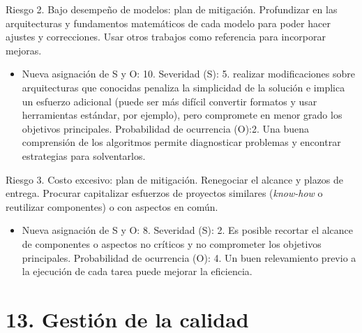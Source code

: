 \documentclass[11pt]{charter}
\begin{document}
Riesgo 2. Bajo desempeño de modelos: plan de mitigación. Profundizar en las arquitecturas y fundamentos matemáticos de cada modelo para poder hacer ajustes y correcciones. Usar otros trabajos como referencia para incorporar mejoras. 
\begin{itemize}
	\item Nueva asignación de S y O: 10.
	\subitem Severidad (S): 5. realizar modificaciones sobre arquitecturas que conocidas penaliza la simplicidad de la solución e implica un esfuerzo adicional (puede ser más difícil convertir formatos y usar herramientas estándar, por ejemplo), pero compromete en menor grado los objetivos principales.
	\subitem Probabilidad de ocurrencia (O):2. Una buena comprensión de los algoritmos permite diagnosticar problemas y encontrar estrategias para solventarlos.
\end{itemize}

Riesgo 3. Costo excesivo: plan de mitigación. Renegociar el alcance y plazos de entrega. Procurar capitalizar esfuerzos de proyectos similares ({\em know-how} o reutilizar componentes) o con aspectos en común.
\begin{itemize}
	\item Nueva asignación de S y O: 8.
	\subitem Severidad (S): 2. Es posible recortar el alcance de componentes o aspectos no críticos y no comprometer los objetivos principales.
	\subitem Probabilidad de ocurrencia (O): 4. Un buen relevamiento previo a la ejecución de cada tarea puede mejorar la eficiencia.
\end{itemize}

\section{13. Gestión de la calidad}
\label{sec:calidad}
\end{document}
